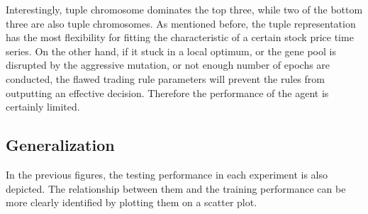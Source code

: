 \documentclass{article}
\begin{document}
Interestingly, tuple chromosome dominates the top three,
while two of the bottom three are also tuple chromosomes.
As mentioned before, the tuple representation has the most flexibility
for fitting the characteristic of a certain stock price time series.
On the other hand, if it stuck in a local optimum, or the gene pool is disrupted by the aggressive mutation,
or not enough number of epochs are conducted,
the flawed trading rule parameters will prevent the rules from outputting an effective decision.
Therefore the performance of the agent is certainly limited.

\subsection{Generalization}\label{subsection-generalization}

In the previous figures, the testing performance in each experiment is also depicted.
The relationship between them and the training performance can be more clearly identified
by plotting them on a scatter plot.
\end{document}
